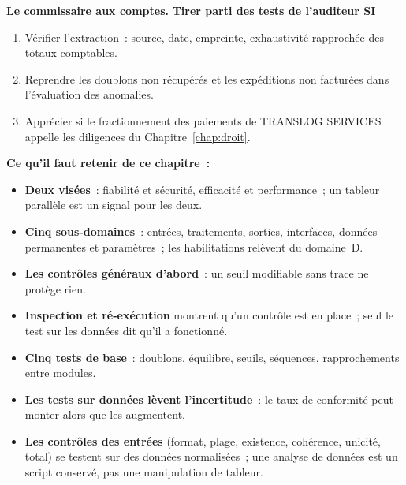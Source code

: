 \begin{boxinfo}
\textbf{Le commissaire aux comptes.}
\textbf{Tirer parti des tests de l'auditeur SI}
\begin{enumerate}
    \item Vérifier l'extraction~: source, date, empreinte, exhaustivité
          rapprochée des totaux comptables.
    \item Reprendre les doublons non récupérés et les expéditions non
          facturées dans l'évaluation des anomalies.
    \item Apprécier si le fractionnement des paiements de TRANSLOG SERVICES
          appelle les diligences du Chapitre~\ref{chap:droit}.
\end{enumerate}
\end{boxinfo}


\separateur

\begin{boxresume}
\textbf{Ce qu'il faut retenir de ce chapitre~:}
\begin{itemize}
    \item \textbf{Deux visées}~: fiabilité et sécurité, efficacité et
          performance~; un tableur parallèle est un signal pour les deux.
    \item \textbf{Cinq sous-domaines}~: entrées, traitements, sorties,
          interfaces, données permanentes et paramètres~; les habilitations
          relèvent du domaine~D.
    \item \textbf{Les contrôles généraux d'abord}~: un seuil modifiable sans
          trace ne protège rien.
    \item \textbf{Inspection et ré-exécution} montrent qu'un contrôle est en
          place~; seul le test sur les données dit qu'il a fonctionné.
    \item \textbf{Cinq tests de base}~: doublons, équilibre, seuils,
          séquences, rapprochements entre modules.
    \item \textbf{Les tests sur données lèvent l'incertitude}~: le taux de
          conformité peut monter alors que les \NON{} augmentent.
    \item \textbf{Les contrôles des entrées} (format, plage, existence, cohérence, unicité, total) se testent sur des données normalisées~; une analyse de données est un script conservé, pas une manipulation de tableur.
\end{itemize}
\end{boxresume}

